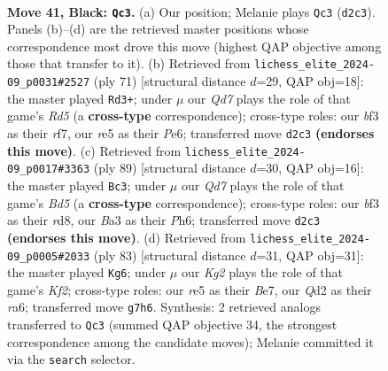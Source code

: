 \documentclass[11pt]{article}
\begin{document}
\clearpage

\begin{figure}[p]\centering
\begin{subfigure}{0.46\textwidth}\centering
\resizebox{\linewidth}{!}{%
\newchessgame
\chessboard[
  setfen={8/pp4kp/6p1/4R3/5PPP/b4BK1/3q4/8 b - - 6 41},
  showmover=false,
  pgfstyle=straightmove, color=movearrow, markmove={d2-c3}
]}
\caption{}
\end{subfigure}\hfill
\begin{subfigure}{0.46\textwidth}\centering
\resizebox{\linewidth}{!}{%
\newchessgame
\chessboard[
  setfen={2k5/1pp2R2/1p2p3/8/1PPr4/PK6/5P2/8 b - - 0 36},
  showmover=false,
  pgfstyle=straightmove, color=movearrow, markmove={d4-d3}
]}
\caption{}
\end{subfigure}
\\[4pt]
\begin{subfigure}{0.46\textwidth}\centering
\resizebox{\linewidth}{!}{%
\newchessgame
\chessboard[
  setfen={3R4/5pk1/7p/3n2p1/3b4/6PP/3B1PK1/8 b - - 2 45},
  showmover=false,
  pgfstyle=straightmove, color=movearrow, markmove={d4-c3}
]}
\caption{}
\end{subfigure}\hfill
\begin{subfigure}{0.46\textwidth}\centering
\resizebox{\linewidth}{!}{%
\newchessgame
\chessboard[
  setfen={8/4bk2/R4p2/3p2p1/3B2P1/4PK2/2r2P2/8 b - - 0 42},
  showmover=false,
  pgfstyle=straightmove, color=movearrow, markmove={f7-g6}
]}
\caption{}
\end{subfigure}
\caption{\textbf{Move 41, Black: \texttt{Qc3}.} (a) Our position; Melanie plays \texttt{Qc3} (\texttt{d2c3}). Panels (b)--(d) are the retrieved master positions whose correspondence most drove this move (highest QAP objective among those that transfer to it). (b) Retrieved from \texttt{lichess\_elite\_2024-09\_p0031\#2527} (ply 71) [structural distance $d$=29, QAP obj=18]: the master played \texttt{Rd3+}; under $\mu$ our \emph{Qd7} plays the role of that game's \emph{Rd5} (a \textbf{cross-type} correspondence); cross-type roles: our \emph{b}f3 as their \emph{r}f7, our \emph{r}e5 as their \emph{P}e6; transferred move \texttt{d2c3} \textbf{(endorses this move)}. (c) Retrieved from \texttt{lichess\_elite\_2024-09\_p0017\#3363} (ply 89) [structural distance $d$=30, QAP obj=16]: the master played \texttt{Bc3}; under $\mu$ our \emph{Qd7} plays the role of that game's \emph{Bd5} (a \textbf{cross-type} correspondence); cross-type roles: our \emph{b}f3 as their \emph{r}d8, our \emph{B}a3 as their \emph{P}h6; transferred move \texttt{d2c3} \textbf{(endorses this move)}. (d) Retrieved from \texttt{lichess\_elite\_2024-09\_p0005\#2033} (ply 83) [structural distance $d$=31, QAP obj=31]: the master played \texttt{Kg6}; under $\mu$ our \emph{Kg2} plays the role of that game's \emph{Kf2}; cross-type roles: our \emph{r}e5 as their \emph{B}e7, our \emph{Q}d2 as their \emph{r}a6; transferred move \texttt{g7h6}. Synthesis: 2 retrieved analogs transferred to \texttt{Qc3} (summed QAP objective 34, the strongest correspondence among the candidate moves); Melanie committed it via the \texttt{search} selector.}
\label{fig:thought-m81}
\end{figure}
\end{document}
